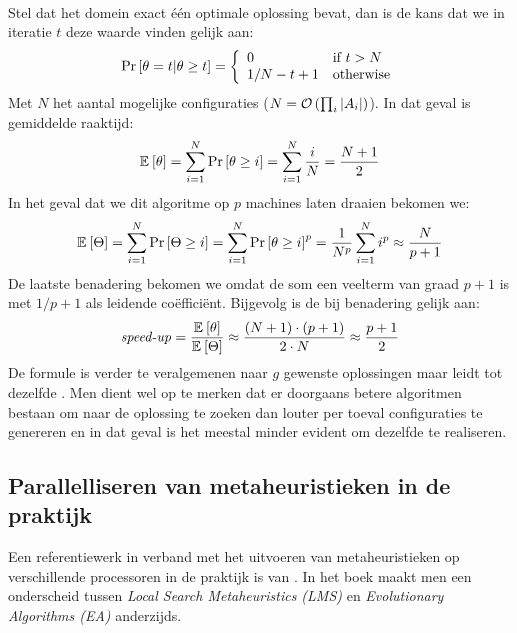 \paragraph{}
Stel dat het domein exact \'e\'en optimale oplossing bevat, dan is de kans dat we in iteratie $t$ deze waarde vinden gelijk aan:
\begin{equation}
\Pr\left[\theta=t|\theta\geq t\right]=\left\{\begin{array}{ll}
0&\mbox{if }t>N\\
1/N-t+1&\mbox{otherwise}
\end{array}\right.
\end{equation}
Met $N$ het aantal mogelijke configuraties ($N=\mathcal{O}\left(\prod_i\left| A_i\right|\right)$). In dat geval is gemiddelde raaktijd:
\begin{equation}
\mathbb{E}_{}\left[\theta\right]=\displaystyle\sum_{i=1}^N\Pr\left[\theta\geq i\right]=\displaystyle\sum_{i=1}^N\displaystyle\frac{i}{N}=\displaystyle\frac{N+1}{2}
\end{equation}
In het geval dat we dit algoritme op $p$ machines laten draaien bekomen we:
\begin{equation}
\mathbb{E}_{}\left[\Theta\right]=\displaystyle\sum_{i=1}^N\Pr\left[\Theta\geq i\right]=\displaystyle\sum_{i=1}^N\Pr\left[\theta\geq i\right]^p=\displaystyle\frac{1}{N^p}\displaystyle\sum_{i=1}^Ni^p\approx\displaystyle\frac{N}{p+1}
\end{equation}
De laatste benadering bekomen we omdat de som een veelterm van graad $p+1$ is met $1/p+1$ als leidende co\"effici\"ent. Bijgevolg is de \absu{} bij benadering gelijk aan:
\begin{equation}
\mbox{\absu{}}=\displaystyle\frac{\mean{\hittime}}{\mean{\phittime}}\approx\displaystyle\frac{\brak{N+1}\cdot\brak{p+1}}{2\cdot N}\approx\displaystyle\frac{p+1}{2}
\eqnlab{minimalSpeedupMetaheuristic}
\end{equation}
De formule is verder te veralgemenen naar $g$ gewenste oplossingen maar leidt tot dezelfde \absu{}. Men dient wel op te merken dat er doorgaans betere algoritmen bestaan om naar de oplossing te zoeken dan louter per toeval configuraties te genereren en in dat geval is het meestal minder evident om dezelfde \absu{} te realiseren.



\subsection{Parallelliseren van metaheuristieken in de praktijk}

Een referentiewerk in verband met het uitvoeren van metaheuristieken op verschillende processoren in de praktijk is  van . In het boek maakt men een onderscheid tussen \emph{Local Search Metaheuristics (LMS)} en \emph{Evolutionary Algorithms (EA)} anderzijds.
